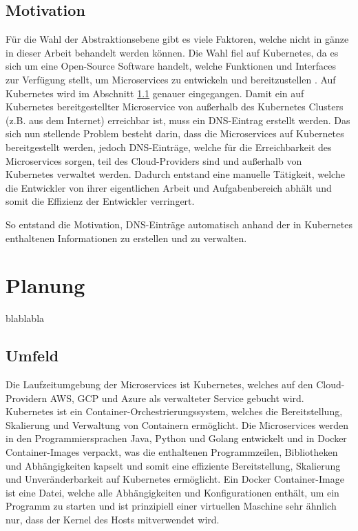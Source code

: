 \subsection{Motivation}
\label{subsec:description:motivation}
Für die Wahl der Abstraktionsebene gibt es viele Faktoren, welche nicht in gänze in dieser Arbeit behandelt werden können.
Die Wahl fiel auf Kubernetes, da es sich um eine Open-Source Software handelt, welche Funktionen und Interfaces zur Verfügung stellt, um Microservices zu entwickeln und bereitzustellen \citep{SpringerNature:2022}.
Auf Kubernetes wird im Abschnitt \ref{subsec:description:umfeld} genauer eingegangen.
\medskip
Damit ein auf Kubernetes bereitgestellter Microservice von außerhalb des Kubernetes Clusters (z.B. aus dem Internet) erreichbar ist, muss ein \ac{DNS}-Eintrag erstellt werden.
Das sich nun stellende Problem besteht darin, dass die Microservices auf Kubernetes bereitgestellt werden, jedoch DNS-Einträge, welche für die Erreichbarkeit des Microservices sorgen, teil des Cloud-Providers sind und außerhalb von Kubernetes verwaltet werden.
Dadurch entstand eine manuelle Tätigkeit, welche die Entwickler von ihrer eigentlichen Arbeit und Aufgabenbereich abhält und somit die Effizienz der Entwickler verringert.
\medskip

So entstand die Motivation, DNS-Einträge automatisch anhand der in Kubernetes enthaltenen Informationen zu erstellen und zu verwalten.

\section{Planung}
\label{sec:description:planung}
blablabla

\subsection{Umfeld}
\label{subsec:description:umfeld}
Die Laufzeitumgebung der Microservices ist Kubernetes, welches auf den Cloud-Providern \ac{AWS}, \ac{GCP} und \ac{Azure} als verwalteter Service gebucht wird.
Kubernetes ist ein Container-Orchestrierungssystem, welches die Bereitstellung, Skalierung und Verwaltung von Containern ermöglicht.
Die Microservices werden in den Programmiersprachen Java, Python und Golang entwickelt und in Docker Container-Images verpackt, was die enthaltenen Programmzeilen, Bibliotheken und Abhängigkeiten kapselt und somit eine effiziente Bereitstellung, Skalierung und Unveränderbarkeit auf Kubernetes ermöglicht.
Ein Docker Container-Image ist eine Datei, welche alle Abhängigkeiten und Konfigurationen enthält, um ein Programm zu starten und ist prinzipiell einer virtuellen Maschine sehr ähnlich nur, dass der Kernel des Hosts mitverwendet wird.
\medskip

